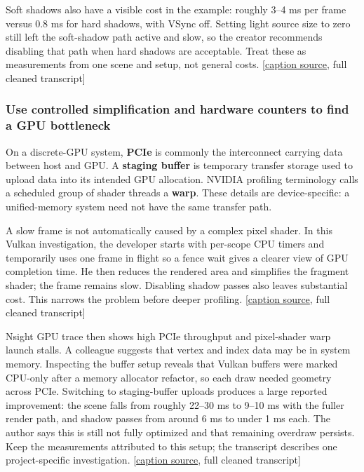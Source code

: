 Soft shadows also have a visible cost in the example: roughly 3--4 ms per frame versus 0.8 ms for hard shadows, with VSync off. Setting light source size to zero still left the soft-shadow path active and slow, so the creator recommends disabling that path when hard shadows are acceptable. Treat these as measurements from one scene and setup, not general costs. {[}\href{https://www.youtube.com/watch?v=qbDrqARX07o}{caption source}, full cleaned transcript{]}

\subsubsection{Use controlled simplification and hardware counters to find a GPU bottleneck}\label{06-engine-ii-ch026-use-controlled-simplification-and-hardware-counters-to-find-a-gpu-bottleneck}

On a discrete-GPU system, \textbf{PCIe} is commonly the interconnect carrying data between host and GPU. A \textbf{staging buffer} is temporary transfer storage used to upload data into its intended GPU allocation. NVIDIA profiling terminology calls a scheduled group of shader threads a \textbf{warp}. These details are device-specific: a unified-memory system need not have the same transfer path.

A slow frame is not automatically caused by a complex pixel shader. In this Vulkan investigation, the developer starts with per-scope CPU timers and temporarily uses one frame in flight so a fence wait gives a clearer view of GPU completion time. He then reduces the rendered area and simplifies the fragment shader; the frame remains slow. Disabling shadow passes also leaves substantial cost. This narrows the problem before deeper profiling. {[}\href{https://www.youtube.com/watch?v=bUUZ1iD9_e4}{caption source}, full cleaned transcript{]}

Nsight GPU trace then shows high PCIe throughput and pixel-shader warp launch stalls. A colleague suggests that vertex and index data may be in system memory. Inspecting the buffer setup reveals that Vulkan buffers were marked CPU-only after a memory allocator refactor, so each draw needed geometry across PCIe. Switching to staging-buffer uploads produces a large reported improvement: the scene falls from roughly 22--30 ms to 9--10 ms with the fuller render path, and shadow passes from around 6 ms to under 1 ms each. The author says this is still not fully optimized and that remaining overdraw persists. Keep the measurements attributed to this setup; the transcript describes one project-specific investigation. {[}\href{https://www.youtube.com/watch?v=bUUZ1iD9_e4}{caption source}, full cleaned transcript{]}

